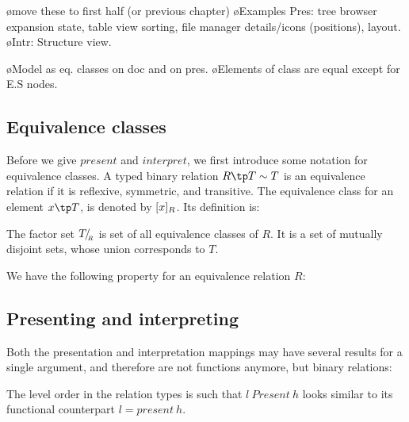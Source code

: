 \bl
\o move these to first half (or previous chapter)
\o Examples Pres: tree browser expansion state, table view sorting, file manager details/icons (positions), layout.
\o Intr: Structure view.
\el

\bl
\o Model as eq. classes on doc and on pres.
\o Elements of class are equal except for E.S nodes.
\el
\fromHere


\subsection{Equivalence classes}

Before we give $present$ and $interpret$, we first introduce some notation for equivalence classes. A typed binary relation $R \tp T \rel T$ is an equivalence relation if it is reflexive, symmetric, and transitive.  The equivalence class for an element $x \tp T$, is denoted by $[{x}]_{{R}}$. Its definition is:


The factor set ${T}\!/_{{_{\!\!{R}}}}$ is set of all equivalence classes of $R$. It is a set of mutually disjoint sets, whose union corresponds to $T$.


We have the following property for an equivalence relation $R$:




\subsection{Presenting and interpreting}

Both the presentation and interpretation mappings may have several results for a single argument, and therefore are not functions anymore, but binary relations: 


The level order in the relation types is such that $l~Present~h$ looks similar to its functional counterpart $l = present~h$. 

